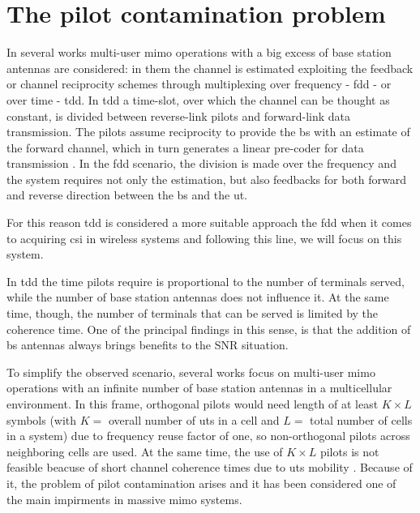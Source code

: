 \documentclass[11pt]{book}
\begin{document}
\section{The pilot contamination problem}
In several works multi-user \gls{mimo} operations with a big excess of base station antennas are considered: in them the channel is estimated exploiting the feedback or channel reciprocity schemes through multiplexing over frequency - \gls{fdd} - or over time - \gls{tdd}. In \gls{tdd} a time-slot, over which the channel can be thought as constant, is divided between reverse-link pilots and forward-link data transmission. The pilots assume reciprocity to provide the \gls{bs} with an estimate of the forward channel, which in turn generates a linear pre-coder for data transmission \cite{Marzetta2010}. In the \gls{fdd} scenario, the division is made over the frequency and the system requires not only the estimation, but also feedbacks for both forward and reverse direction between the \gls{bs} and the \gls{ut}.

For this reason \gls{tdd} is considered a more suitable approach the \gls{fdd} when it comes to acquiring \gls{csi} in wireless systems \cite{Elijah2016} and following this line, we will focus on this system.

In \gls{tdd} the time pilots require is proportional to the number of terminals served, while the number of base station antennas does not influence it. At the same time, though, the number of terminals that can be served is limited by the coherence time. One of the principal findings in this sense, is that the addition of \gls{bs} antennas always brings benefits to the SNR situation.

To simplify the observed scenario, several works focus on multi-user \gls{mimo} operations with an infinite number of base station antennas in a multicellular environment. In this frame, orthogonal pilots would need length of at least $K \times L$ symbols (with $K = $ overall number of \gls{ut}s in a cell and $L = $ total number of cells in a system) due to frequency reuse factor of one, so non-orthogonal pilots across neighboring cells are used. At the same time, the use of $K \times L$ pilots is not feasible beacuse of short channel coherence times due to \gls{ut}s mobility \cite{Elijah2016}. Because of it, the problem of pilot contamination arises and it has been considered one of the main impirments in massive \gls{mimo} systems.
\end{document}
